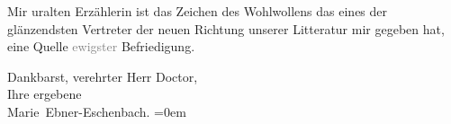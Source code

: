 \pstart
           Mir uralten Erzählerin ist das Zeichen des Wohlwollens das eines der glänzendsten
               Vertreter der neuen Richtung unserer Litteratur mir gegeben hat, eine Quelle
                  \textcolor{gray}{ewigster} Befriedigung.\pend
           
\pstart
           Dankbarst, verehrter Herr Doctor, {\\[\baselineskip]}Ihre ergebene {\\[\baselineskip]}\spacefill\mbox{Marie Ebner-Eschenbach.}\pend
           \leftskip=0em{}\endnumbering{}  \newcommand{\dateiname}{L02581}\newcommand{\titel}{Marie von Ebner-Eschenbach an Arthur Schnitzler, 26. 9. 1901}\newcommand{\editorInnen}{Martin Anton Müller und Laura Untner}
